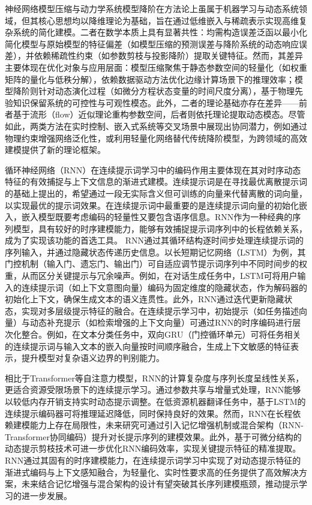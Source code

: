 神经网络模型压缩与动力学系统模型降阶在方法论上虽属于机器学习与动态系统领域，但其核心思想均以降维理论为基础，旨在通过低维嵌入与稀疏表示实现高维复杂系统的简化建模。二者在数学本质上具有显著共性：均需构造误差泛函以最小化简化模型与原始模型的特征偏差（如模型压缩的预测误差与降阶系统的动态响应误差），并依赖稀疏性约束（如参数剪枝与投影降阶）提取关键特征。然而，其差异主要体现在优化对象与应用层面：模型压缩聚焦于静态参数空间的轻量化（如权重矩阵的量化与低秩分解），依赖数据驱动方法优化边缘计算场景下的推理效率；模型降阶则针对动态演化过程（如微分方程状态变量的时间尺度分离），基于物理先验知识保留系统的可控性与可观性模态。此外，二者的理论基础亦存在差异——前者基于流形（flow）近似理论重构参数空间，后者则依托理论提取动态模态。尽管如此，两类方法在实时控制、嵌入式系统等交叉场景中展现出协同潜力，例如通过物理约束增强网络泛化性，或利用轻量化网络替代传统降阶模型，为跨领域的高效建模提供了新的理论框架。

循环神经网络（RNN）在连续提示词学习中的编码作用主要体现在其对时序动态特征的有效捕捉与上下文信息的渐进式建模。连续提示词\cite{liuPTuningV2Prompt2022}是在寻找最优离散提示词的基础上提出的，希望通过一段无实际含义但可训练的向量来代替离散的词向量，以实现最优的提示词效果。在连续提示词中最重要的是连续提示词向量的初始化嵌入，嵌入模型既要考虑编码的轻量性又要包含语序信息。RNN作为一种经典的序列模型，具有较好的时序建模能力，能够有效捕捉提示词序列中的长程依赖关系，成为了实现该功能的首选工具。
RNN通过其循环结构逐时间步处理连续提示词的序列输入，并通过隐藏状态传递历史信息。以长短期记忆网络（LSTM）为例，其门控机制（输入门、遗忘门、输出门）可自适应调节提示词序列中不同时间步的权重，从而区分关键提示与冗余噪声。例如，在对话生成任务中，LSTM可将用户输入的连续提示词（如上下文意图向量）编码为固定维度的隐藏状态，作为解码器的初始化上下文，确保生成文本的语义连贯性。此外，RNN通过迭代更新隐藏状态，实现对多层级提示特征的融合。在连续提示学习中，初始提示（如任务描述向量）与动态补充提示（如检索增强的上下文向量）可通过RNN的时序编码进行层次化整合。例如，在文本分类任务中，双向GRU（门控循环单元）可将任务相关的连续提示词与输入文本的嵌入向量按时间顺序融合，生成上下文敏感的特征表示，提升模型对复杂语义边界的判别能力。

相比于Transformer等自注意力模型，RNN的计算复杂度与序列长度呈线性关系，更适合资源受限场景下的连续提示学习。通过参数共享与增量式处理，RNN能够以较低内存开销支持实时动态提示调整。在低资源机器翻译任务中，基于LSTM的连续提示编码器可将推理延迟降低，同时保持良好的效果。然而，RNN在长程依赖建模能力上存在局限性，未来研究可通过引入记忆增强机制或混合架构（RNN-Transformer协同编码）提升对长提示序列的建模效果。此外，基于可微分结构的动态提示剪枝技术可进一步优化RNN编码效率，实现关键提示特征的精准提取。RNN通过其固有的时序建模能力，在连续提示词学习中实现了对动态提示特征的渐进式编码与上下文感知融合，为轻量化、实时性要求高的任务提供了高效解决方案，未来结合记忆增强与混合架构的设计有望突破其长序列建模瓶颈，推动提示学习的进一步发展。

